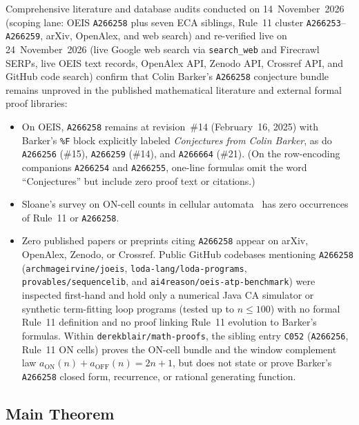 \documentclass[11pt]{article}
\theoremstyle{definition}
\newcommand{\seq}[1]{\texttt{#1}}
\begin{document}
Comprehensive literature and database audits conducted on 14~November~2026 (scoping lane: OEIS \seq{A266258} plus seven ECA siblings, Rule~11 cluster \seq{A266253}--\seq{A266259}, arXiv, OpenAlex, and web search) and re-verified live on 24~November~2026 (live Google web search via \texttt{search\_web} and Firecrawl SERPs, live OEIS text records, OpenAlex API, Zenodo API, Crossref API, and GitHub code search) confirm that Colin Barker's \seq{A266258} conjecture bundle remains unproved in the published mathematical literature and external formal proof libraries:
\begin{itemize}
\item On OEIS, \seq{A266258} remains at revision~\#14 (February~16, 2025) with Barker's \texttt{\%F} block explicitly labeled \emph{Conjectures from Colin Barker}, as do \seq{A266256} (\#15), \seq{A266259} (\#14), and \seq{A266664} (\#21). (On the row-encoding companions \seq{A266254} and \seq{A266255}, one-line formulas omit the word ``Conjectures'' but include zero proof text or citations.)
\item Sloane's survey on ON-cell counts in cellular automata~\cite{sloane2015} has zero occurrences of Rule~11 or \seq{A266258}.
\item Zero published papers or preprints citing \seq{A266258} appear on arXiv, OpenAlex, Zenodo, or Crossref. Public GitHub codebases mentioning \seq{A266258} ({\small\nolinkurl{archmageirvine/joeis}}, {\small\nolinkurl{loda-lang/loda-programs}}, {\small\nolinkurl{provables/sequencelib}}, and {\small\nolinkurl{ai4reason/oeis-atp-benchmark}}) were inspected first-hand and hold only a numerical Java CA simulator or synthetic term-fitting loop programs (tested up to $n \le 100$) with no formal Rule~11 definition and no proof linking Rule~11 evolution to Barker's formulas. Within \texttt{derekblair/math-proofs}, the sibling entry \texttt{C052} (\seq{A266256}, Rule~11 ON cells) proves the ON-cell bundle and the window complement law $a_{\mathrm{ON}}(n) + a_{\mathrm{OFF}}(n) = 2n + 1$, but does not state or prove Barker's \seq{A266258} closed form, recurrence, or rational generating function.
\end{itemize}

\subsection{Main Theorem}
\end{document}
